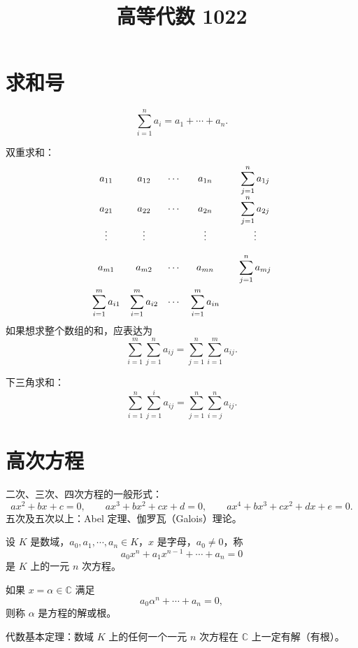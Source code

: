 \documentclass[UTF8,11pt]{ctexart}
\title{高等代数 1022}
\date{}
\theoremstyle{cnthm}
\begin{document}
\maketitle

\section{求和号}

\[
\sum_{i=1}^n a_i=a_1+\cdots+a_n.
\]

双重求和：
\[
\begin{array}{cccc@{\qquad}c}
a_{11} & a_{12} & \cdots & a_{1n}
  & \displaystyle\sum_{j=1}^{n} a_{1j} \\[2.5ex]
a_{21} & a_{22} & \cdots & a_{2n}
  & \displaystyle\sum_{j=1}^{n} a_{2j} \\[2.5ex]
\vdots & \vdots &        & \vdots
  & \vdots \\[2.5ex]
a_{m1} & a_{m2} & \cdots & a_{mn}
  & \displaystyle\sum_{j=1}^{n} a_{mj} \\[3.5ex]
\displaystyle\sum_{i=1}^{m} a_{i1}
  & \displaystyle\sum_{i=1}^{m} a_{i2}
  & \cdots
  & \displaystyle\sum_{i=1}^{m} a_{in}
  &
\end{array}
\]
如果想求整个数组的和，应表达为
\[
\sum_{i=1}^m\sum_{j=1}^n a_{ij}=\sum_{j=1}^n\sum_{i=1}^m a_{ij}.
\]

下三角求和：
\[
\sum_{i=1}^n\sum_{j=1}^i a_{ij}=\sum_{j=1}^n\sum_{i=j}^n a_{ij}.
\]

\section{高次方程}

二次、三次、四次方程的一般形式：
\[
ax^2+bx+c=0,\qquad
ax^3+bx^2+cx+d=0,\qquad
ax^4+bx^3+cx^2+dx+e=0.
\]
五次及五次以上：Abel 定理、伽罗瓦（Galois）理论。

设 $K$ 是数域，$a_0,a_1,\cdots,a_n\in K$，$x$ 是字母，$a_0\neq0$，称
\[
a_0x^n+a_1x^{n-1}+\cdots+a_n=0
\]
是 $K$ 上的一元 $n$ 次方程。

如果 $x=\alpha\in\mathbb{C}$ 满足
\[
a_0\alpha^n+\cdots+a_n=0,
\]
则称 $\alpha$ 是方程的解或根。

代数基本定理：数域 $K$ 上的任何一个一元 $n$ 次方程在 $\mathbb{C}$ 上一定有解（有根）。
\end{document}
